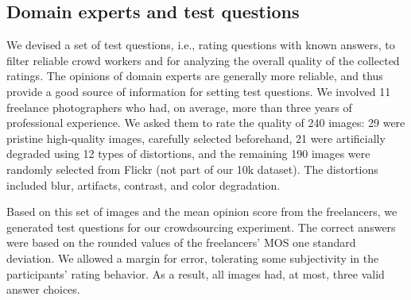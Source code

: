 \documentclass[10pt,journal,compsoc]{IEEEtran}
\begin{document}
\subsection{Domain experts and test questions}
We devised a set of test questions, i.e., rating questions with known answers, to filter reliable crowd workers and for analyzing the overall quality of the collected ratings. The opinions of domain experts are generally more reliable, and thus provide a good source of information for setting test questions. We involved 11 freelance photographers who had, on average, more than three years of professional experience. We asked them to rate the quality of 240 images: 29 were pristine high-quality images, carefully selected beforehand, 21 were artificially degraded using 12 types of distortions, and the remaining 190 images were randomly selected from Flickr (not part of our 10k dataset). The distortions included blur, artifacts, contrast, and color degradation. 

Based on this set of images and the mean opinion score from the freelancers, we generated test questions for our crowdsourcing experiment. The correct answers were based on the rounded values of the freelancers' MOS  one standard deviation. We allowed a margin for error, tolerating some subjectivity in the participants' rating behavior.  As a result, all images had, at most, three valid answer choices.
\end{document}
